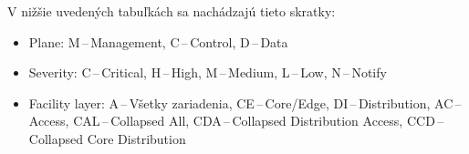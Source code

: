 \noindent
V nižšie uvedených tabuľkách sa nachádzajú tieto skratky:
\begin{itemize}
	\item Plane: M\,--\,Management, C\,--\,Control, D\,--\,Data
	\item Severity: C\,--\,Critical, H\,--\,High, M\,--\,Medium, L\,--\,Low, N\,--\,Notify
	\item Facility layer: A\,--\,Všetky zariadenia, CE\,--\,Core/Edge, DI\,--\,Distribution, AC\,--\,Access, CAL\,--\,Collapsed All, CDA\,--\,Collapsed Distribution Access, CCD\,--\,Collapsed Core Distribution
\end{itemize}



\newpage


\footnotesize
{}

